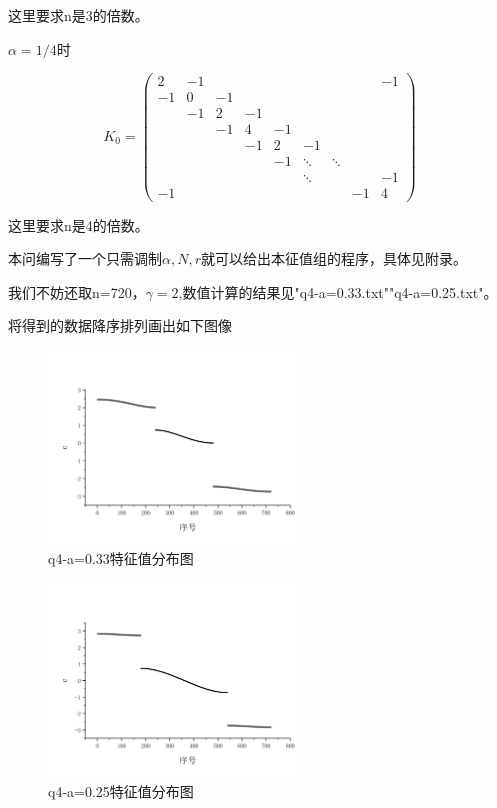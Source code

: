 \documentclass[10pt, a4paper]{article}
\begin{document}
    这里要求n是3的倍数。

    $\alpha=1/4$时

    \[
        K_0=\begin{pmatrix}
            2&-1& & & & & & &-1\\
            -1&0&-1& & & & & &\\
             &-1&2&-1& & & & & \\
             & &-1&4& -1& & & &\\
             & & &-1&2&-1& & &\\
             &&&&-1 & \ddots&\ddots& \\
             &&&&& \ddots& && -1\\
            -1& & & & & & &-1&4 
        \end{pmatrix}
    \]

    这里要求n是4的倍数。

    本问编写了一个只需调制$\alpha,N,r$就可以给出本征值组的程序，具体见附录。

    我们不妨还取n=720，$\gamma=2$,数值计算的结果见"q4-a=0.33.txt""q4-a=0.25.txt"。

    将得到的数据降序排列画出如下图像

    \begin{figure}[H]
        \centering
        \includegraphics[width=0.6\textwidth]{q4-a=0.33特征值分布图.jpg}
        \caption{q4-a=0.33特征值分布图}\label{fig:q4-a=0.33特征值分布图}
    \end{figure}

    \begin{figure}[H]
        \centering
        \includegraphics[width=0.6\textwidth]{q4-a=0.25特征值分布图.jpg}
        \caption{q4-a=0.25特征值分布图}\label{fig:q4-a=0.25特征值分布图}
    \end{figure}
\end{document}
